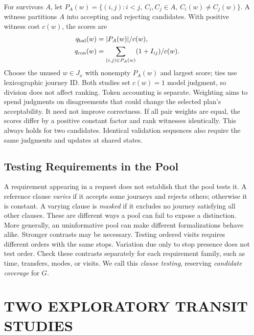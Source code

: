 \documentclass[a4paper,twoside]{article}
\begin{document}
For survivors $A$, let $P_A(w)=\{(i,j):i<j,\ C_i,C_j\in A,\ C_i(w)\ne C_j(w)\}$. A witness partitions $A$ into accepting and rejecting candidates. With positive witness cost $c(w)$, the scores are
\begin{equation}
\begin{split}
 q_{\rm bal}(w)&=|P_A(w)|/c(w),\\
 q_{\rm con}(w)&=\sum_{(i,j)\in P_A(w)}(1+I_{ij})/c(w).
\end{split}
\label{eq:scores}
\end{equation}
Choose the unused $w\in J_x$ with nonempty $P_A(w)$ and largest score; ties use lexicographic journey ID. Both studies set $c(w)=1$ model judgment, so division does not affect ranking. Token accounting is separate. Weighting aims to spend judgments on disagreements that could change the selected plan's acceptability. It need not improve correctness.
If all pair weights are equal, the scores differ by a positive constant factor and rank witnesses identically. This always holds for two candidates. Identical validation sequences also require the same judgments and updates at shared states.

\subsection{Testing Requirements in the Pool}

A requirement appearing in a request does not establish that the pool tests it. A reference clause \emph{varies} if it accepts some journeys and rejects others; otherwise it is constant. A varying clause is \emph{masked} if it excludes no journey satisfying all other clauses. These are different ways a pool can fail to expose a distinction. More generally, an uninformative pool can make different formalizations behave alike.
Stronger contrasts may be necessary. Testing ordered visits requires different orders with the same stops. Variation due only to stop presence does not test order. Check these contrasts separately for each requirement family, such as time, transfers, modes, or visits. We call this \emph{clause testing}, reserving \emph{candidate coverage} for $G$.


\section{\uppercase{Two Exploratory Transit Studies}}
\label{sec:setup}
\end{document}
